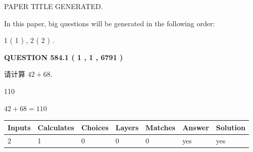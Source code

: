 \documentclass{ctexart}
\begin{document}
   
 \vspace{0.2in}
 
 
 
 
   
   
 PAPER TITLE GENERATED.
   
   
   
\vspace{0.2in}
   
In this paper, big questions will be generated in the following order: 
   
   
   1 ( 1 )
 ,
   2 ( 2 )
 .
  
\vspace{0.2in}
  
{\textbf{\Large{QUESTION
584.1 
 ( 1 , 1 , 6791 )
}}}
  
  
 
请计算 $ %
42 +  %
68 $.
 
 
 
\noindent{}
 
 

110
 
 
\noindent{}
 
 

 
 
 
\noindent{}
 
 

$ %
42 +  %
68=   %
110$
 
 
\noindent{}
 
 

 
   
   
   
   
\noindent\begin{tabular}{|l|l|l|l|l|l|l|}
 \hline
Inputs & Calculates & Choices & Layers & Matches & Answer & Solution \\ \hline
 2  & 
 1  & 
 0
  & 
 0  & 
 0  & 
  yes & 
  yes 
  \\ \hline
 \end{tabular}
   
   
   
   
\noindent{}
   
   
  
\end{document}
